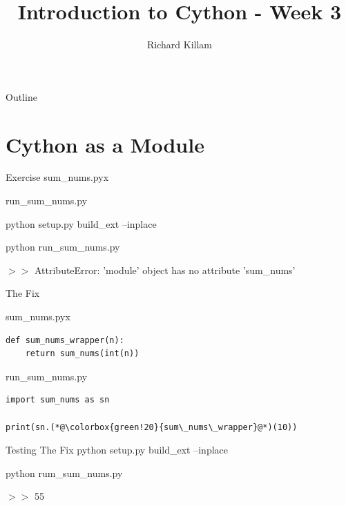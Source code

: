 \documentclass[11pt]{beamer}
\author{Richard Killam}
\title{Introduction to Cython - Week 3}
\begin{document}
\begin{frame}
    \titlepage
\end{frame}

\begin{frame}{Outline}
    \begin{multicols}{2}
        \tableofcontents
    \end{multicols}
\end{frame}

\section{Cython as a Module}
\begin{frame}[fragile]{Exercise}
	sum\_nums.pyx
    \pause
    
\end{frame}

\begin{frame}[fragile]{run\_sum\_nums.py}
    \pause
    

	\vspace{1cm}

    \pause
    python setup.py build\_ext --inplace

    python run\_sum\_nums.py

    \pause
    $>>$ AttributeError: 'module' object has no attribute 'sum\_nums'

\end{frame}

\begin{frame}[fragile]{The Fix}

    sum\_nums.pyx
    \begin{lstlisting}
def sum_nums_wrapper(n):
    return sum_nums(int(n))
    \end{lstlisting}

    \vspace{1cm}

    \pause
    run\_sum\_nums.py
    \begin{lstlisting}
import sum_nums as sn

print(sn.(*@\colorbox{green!20}{sum\_nums\_wrapper}@*)(10))
    \end{lstlisting}
\end{frame}

\begin{frame}[fragile]{Testing The Fix}
    python setup.py build\_ext --inplace

    python rum\_sum\_nums.py

    \pause
    $>>$ 55

\end{frame}
\end{document}
